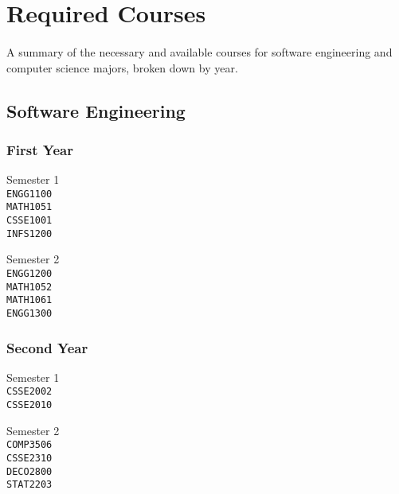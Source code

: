 \section{Required Courses}

\paragraph{} A summary of the necessary and available courses for software engineering and computer science majors, broken down by year.

\subsection{Software Engineering}

\subsubsection{First Year}
\begin{center}
\begin{multicols}{2}
Semester 1 \\
\texttt{ENGG1100} \\
\texttt{MATH1051} \\
\texttt{CSSE1001} \\
\texttt{INFS1200} \\
\vfill
\columnbreak

Semester 2 \\
\texttt{ENGG1200} \\
\texttt{MATH1052} \\
\texttt{MATH1061} \\
\texttt{ENGG1300} \\ 
\end{multicols}
\end{center}

\subsubsection{Second Year}
\begin{center}
\begin{multicols}{2}
Semester 1 \\
\texttt{CSSE2002} \\
\texttt{CSSE2010} \\
\vfill
\columnbreak

Semester 2 \\
\texttt{COMP3506} \\
\texttt{CSSE2310} \\
\texttt{DECO2800} \\
\texttt{STAT2203} \\
\end{multicols}
\end{center}

